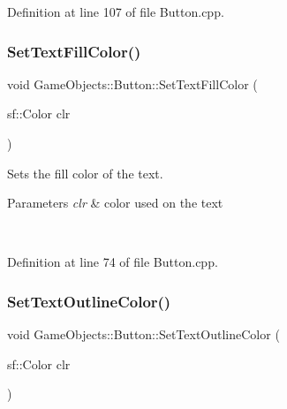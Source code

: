 Definition at line 107 of file Button.\+cpp.


\begin{DoxyCode}{0}

\end{DoxyCode}
\mbox{\label{class_game_objects_1_1_button_a78eba5d1428ece83f6aae4942f8e1dcf}} 
\subsubsection{\texorpdfstring{SetTextFillColor()}{SetTextFillColor()}}
{\footnotesize\ttfamily void Game\+Objects\+::\+Button\+::\+Set\+Text\+Fill\+Color (\begin{DoxyParamCaption}\item[{sf\+::\+Color}]{clr }\end{DoxyParamCaption})}



Sets the fill color of the text. 


\begin{DoxyParams}{Parameters}
{\em clr} & color used on the text \begin{DoxyVerb}\end{DoxyVerb}
 \\
\hline
\end{DoxyParams}


Definition at line 74 of file Button.\+cpp.


\begin{DoxyCode}{0}

\end{DoxyCode}
\mbox{\label{class_game_objects_1_1_button_afa9aeb9d1538547a455a2388259ec928}} 
\subsubsection{\texorpdfstring{SetTextOutlineColor()}{SetTextOutlineColor()}}
{\footnotesize\ttfamily void Game\+Objects\+::\+Button\+::\+Set\+Text\+Outline\+Color (\begin{DoxyParamCaption}\item[{sf\+::\+Color}]{clr }\end{DoxyParamCaption})}



